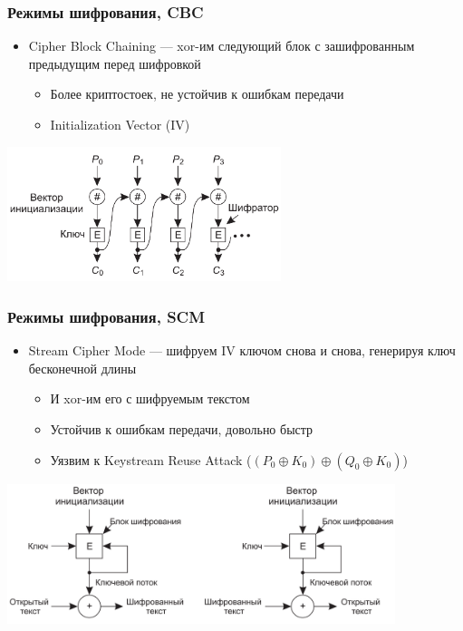 \documentclass{../../slides-style}
\begin{document}
    \begin{frame}
        \frametitle{Режимы шифрования, CBC}
        \begin{itemize}
            \item Cipher Block Chaining --- xor-им следующий блок с зашифрованным предыдущим перед шифровкой
            \begin{itemize}
                \item Более криптостоек, не устойчив к ошибкам передачи
                \item Initialization Vector (IV)
            \end{itemize}
        \end{itemize}
        \begin{center}
            \includegraphics[width=0.6\textwidth]{cbc.png}
        \end{center}
    \end{frame}

    \begin{frame}
        \frametitle{Режимы шифрования, SCM}
        \begin{itemize}
            \item Stream Cipher Mode --- шифруем IV ключом снова и снова, генерируя ключ бесконечной длины
            \begin{itemize}
                \item И xor-им его с шифруемым текстом
                \item Устойчив к ошибкам передачи, довольно быстр
                \item Уязвим к Keystream Reuse Attack ($(P_0 \oplus K_0) \oplus (Q_0 \oplus K_0)$)
            \end{itemize}
        \end{itemize}
        \begin{center}
            \includegraphics[width=0.85\textwidth]{scm.png}
        \end{center}
    \end{frame}
\end{document}
